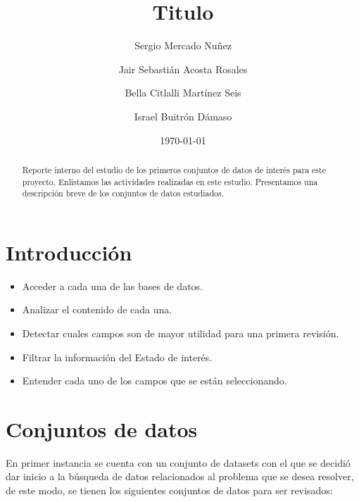 \documentclass[10pt,letterpaper]{article}
\begin{document}
\title{Titulo}
\author{%
Sergio Mercado Nu\~nez
\and
Jair Sebasti\'an Acosta Rosales
\and
Bella Citlalli Mart\'inez Seis
\and
Israel Buitr\'on D\'amaso
}
\date{\today}

\maketitle

\begin{abstract}
  Reporte interno del estudio de los primeros conjuntos de datos de inter\'es para este proyecto.
  Enlistamos las actividades realizadas en este estudio.
  Presentamos una descripci\'on breve de los conjuntos de datos estudiados.
\end{abstract}

\section{Introducción} %
\label{sec:introduccion}

\begin{itemize}
\item Acceder a cada una de las bases de datos.
\item Analizar el contenido de cada una. 
\item Detectar cuales campos son de mayor utilidad para una primera revisi\'on.
\item Filtrar la informaci\'on del Estado de inter\'es.
\item Entender cada uno de los campos que se est\'an seleccionando.
\end{itemize}	

%
%

\section{Conjuntos de datos} %
\label{sec:conjuntos_de_datos}

En primer instancia se cuenta con un conjunto de datasets con el que se decidi\'o dar inicio a la b\'usqueda de datos relacionados al problema que se desea resolver, de este modo, se tienen los siguientes conjuntos de datos para ser revisados:
\end{document}
